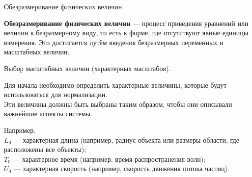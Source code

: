 \documentclass{beamer}
\begin{document}
	\begin{frame}{Обезразмеривание физических величин}
	
		\textbf{Обезразмеривание физических величин} --- процесс приведения уравнений или величин к безразмерному виду, то есть к форме, где отсутствуют явные единицы измерения. 
		Это достигается путём введения безразмерных переменных и масштабных величин. 

		\vspace{0.15cm}
		Выбор масштабных величин (характерных масштабов).

		Для начала необходимо определить характерные величины, которые будут использоваться для нормализации.\\
		Эти величины должны быть выбраны таким образом, чтобы они описывали важнейшие аспекты системы.
		
		\vspace{0.15cm}
		\footnotesize
		Например.\\

    $L_0$ --- характерная длина (например, радиус объекта или размеры области, где расположены все объекты);\\
    $T_0$ --- характерное время (например, время распространения волн);\\
    $U_0$ --- характерная скорость (например, скорость движения потока частиц).



	
	\end{frame}
\end{document}
